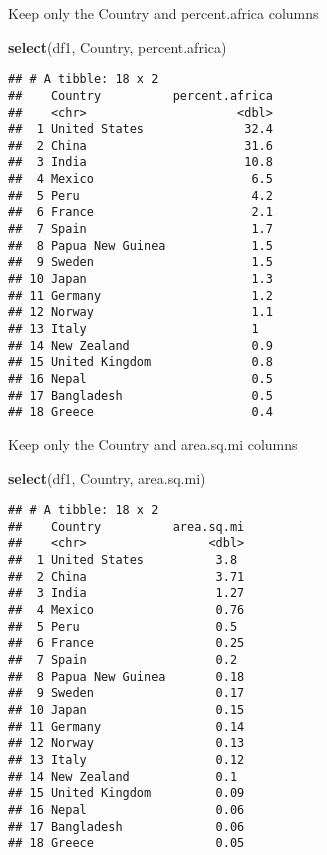\documentclass[
]{article}
\newenvironment{Shaded}{\begin{snugshade}}{\end{snugshade}}
\newcommand{\FunctionTok}[1]{\textcolor[rgb]{0.13,0.29,0.53}{\textbf{#1}}}
\newcommand{\NormalTok}[1]{#1}
\begin{document}
Keep only the Country and percent.africa columns

\begin{Shaded}
\begin{Highlighting}[]
\FunctionTok{select}\NormalTok{(df1, Country, percent.africa) }
\end{Highlighting}
\end{Shaded}

\begin{verbatim}
## # A tibble: 18 x 2
##    Country          percent.africa
##    <chr>                     <dbl>
##  1 United States              32.4
##  2 China                      31.6
##  3 India                      10.8
##  4 Mexico                      6.5
##  5 Peru                        4.2
##  6 France                      2.1
##  7 Spain                       1.7
##  8 Papua New Guinea            1.5
##  9 Sweden                      1.5
## 10 Japan                       1.3
## 11 Germany                     1.2
## 12 Norway                      1.1
## 13 Italy                       1  
## 14 New Zealand                 0.9
## 15 United Kingdom              0.8
## 16 Nepal                       0.5
## 17 Bangladesh                  0.5
## 18 Greece                      0.4
\end{verbatim}

Keep only the Country and area.sq.mi columns

\begin{Shaded}
\begin{Highlighting}[]
\FunctionTok{select}\NormalTok{(df1, Country, area.sq.mi)}
\end{Highlighting}
\end{Shaded}

\begin{verbatim}
## # A tibble: 18 x 2
##    Country          area.sq.mi
##    <chr>                 <dbl>
##  1 United States          3.8 
##  2 China                  3.71
##  3 India                  1.27
##  4 Mexico                 0.76
##  5 Peru                   0.5 
##  6 France                 0.25
##  7 Spain                  0.2 
##  8 Papua New Guinea       0.18
##  9 Sweden                 0.17
## 10 Japan                  0.15
## 11 Germany                0.14
## 12 Norway                 0.13
## 13 Italy                  0.12
## 14 New Zealand            0.1 
## 15 United Kingdom         0.09
## 16 Nepal                  0.06
## 17 Bangladesh             0.06
## 18 Greece                 0.05
\end{verbatim}
\end{document}
